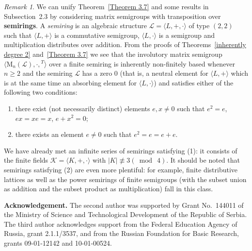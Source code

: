 \documentclass[11pt,reqno]{amsart}
\numberwithin{equation}{section}
\theoremstyle{remark}
\newtheorem{Rmk}{Remark}[section]
\begin{document}
\begin{Rmk}
We can unify Theorem~\ref{Theorem 3.7} and some results in
Subsection~2.3 by considering matrix semigroups with transposition
over \textbf{semirings}. A \emph{semiring} is an algebraic
structure $\mathcal{L}=\langle L,+,\cdot\rangle$ of type $(2,2)$
such that $\langle L,+\rangle$ is a commutative semigroup,
$\langle L,\cdot\rangle$ is a semigroup and multiplication
distributes over addition. From the proofs of
Theorems~\ref{inherently degree 2} and~\ref{Theorem 3.7} we see
that the involutory matrix semigroup
$\langle\mathrm{M}_n(\mathcal{L}),\cdot,{}^T\rangle$ over a finite
semiring is inherently non-finitely based whenever $n\ge 2$ and
the semiring $\mathcal{L}$ has a zero 0 (that is, a neutral
element for $\langle L,+\rangle$ which is at the same time an
absorbing element for $\langle L,\cdot\rangle$) and satisfies
either of the following two conditions:
\begin{enumerate}
\item there exist (not necessarily distinct) elements $e,x\ne 0$
such that $e^2=e$, $ex=xe=x$, $e+x^2=0$;
\item there exists an element $e\ne 0$ such that $e^2=e=e+e$.
\end{enumerate}
We have already met an infinite series of semirings satisfying
(1): it consists of the finite fields $\mathcal{K}=\langle
K,+,\cdot\rangle$ with $\vert K\vert\mathrel{\not\equiv 3}(\bmod\
4)$. It should be noted that semirings satisfying (2) are even
more plentiful: for example, finite distributive lattices as well
as the power semirings of finite semigroups (with the subset union
as addition and the subset product as multiplication) fall in this
class.
\end{Rmk}

\noindent\textbf{Acknowledgement.} The second author was supported
by Grant No.\ 144011 of the Ministry of Science and Technological
Development of the Republic of Serbia. The third author
acknowledges support from the Federal Education Agency of Russia,
grant 2.1.1/3537, and from the Russian Foundation for Basic
Research, grants 09-01-12142 and 10-01-00524.
\end{document}
